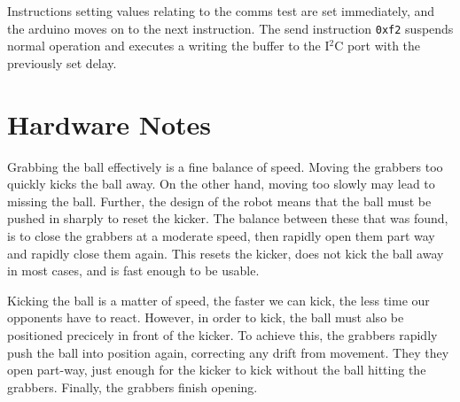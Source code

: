 \documentclass[a4paper]{scrartcl}
\begin{document}
Instructions setting values relating to the comms test are set immediately,
and the arduino moves on to the next instruction. The send instruction
\texttt{0xf2} suspends normal operation and executes a writing the buffer to
the I$^2$C port with the previously set delay.

\section{Hardware Notes}

Grabbing the ball effectively is a fine balance of speed. Moving the grabbers
too quickly kicks the ball away. On the other hand, moving too slowly may lead
to missing the ball. Further, the design of the robot means that the ball must
be pushed in sharply to reset the kicker. The balance between these that was
found, is to close the grabbers at a moderate speed, then rapidly open them
part way and rapidly close them again. This resets the kicker, does not kick the ball away in most cases, and is fast enough to be usable.

Kicking the ball is a matter of speed, the faster we can kick, the less time
our opponents have to react. However, in order to kick, the ball must also be
positioned precicely in front of the kicker. To achieve this, the grabbers
rapidly push the ball into position again, correcting any drift from movement.
They they open part-way, just enough for the kicker to kick without the ball
hitting the grabbers. Finally, the grabbers finish opening.
\end{document}
